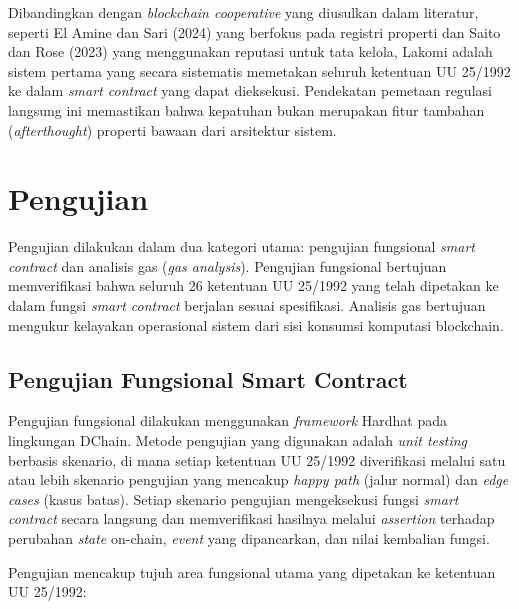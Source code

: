 Dibandingkan dengan \textit{blockchain cooperative} yang diusulkan dalam literatur, seperti El Amine dan Sari (2024) yang berfokus pada registri properti dan Saito dan Rose (2023) yang menggunakan reputasi untuk tata kelola, Lakomi adalah sistem pertama yang secara sistematis memetakan seluruh ketentuan UU 25/1992 ke dalam \textit{smart contract} yang dapat dieksekusi. Pendekatan pemetaan regulasi langsung ini memastikan bahwa kepatuhan bukan merupakan fitur tambahan (\textit{afterthought}) properti bawaan dari arsitektur sistem.

\section{Pengujian}

Pengujian dilakukan dalam dua kategori utama: pengujian fungsional \textit{smart contract} dan analisis gas (\textit{gas analysis}). Pengujian fungsional bertujuan memverifikasi bahwa seluruh 26 ketentuan UU 25/1992 yang telah dipetakan ke dalam fungsi \textit{smart contract} berjalan sesuai spesifikasi. Analisis gas bertujuan mengukur kelayakan operasional sistem dari sisi konsumsi komputasi blockchain.

\subsection{Pengujian Fungsional Smart Contract}

Pengujian fungsional dilakukan menggunakan \textit{framework} Hardhat pada lingkungan DChain. Metode pengujian yang digunakan adalah \textit{unit testing} berbasis skenario, di mana setiap ketentuan UU 25/1992 diverifikasi melalui satu atau lebih skenario pengujian yang mencakup \textit{happy path} (jalur normal) dan \textit{edge cases} (kasus batas). Setiap skenario pengujian mengeksekusi fungsi \textit{smart contract} secara langsung dan memverifikasi hasilnya melalui \textit{assertion} terhadap perubahan \textit{state} on-chain, \textit{event} yang dipancarkan, dan nilai kembalian fungsi.

Pengujian mencakup tujuh area fungsional utama yang dipetakan ke ketentuan UU 25/1992:

